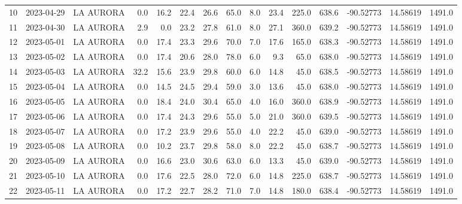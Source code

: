 \documentclass[12pt]{article}
\begin{document}
\begin{center}
\begin{tabular}{lllrrrrrrrrrrrr}
10  & 2023-04-29 &  LA AURORA &     0.0 &  16.2 &   22.4 &  26.6 &     65.0 &  8.0 &        23.4 &       225.0 &      638.6 & -90.52773 &  14.58619 &   1491.0 \\
11  & 2023-04-30 &  LA AURORA &     2.9 &   0.0 &   23.2 &  27.8 &     61.0 &  8.0 &        27.1 &       360.0 &      639.2 & -90.52773 &  14.58619 &   1491.0 \\
12  & 2023-05-01 &  LA AURORA &     0.0 &  17.4 &   23.3 &  29.6 &     70.0 &  7.0 &        17.6 &       165.0 &      638.3 & -90.52773 &  14.58619 &   1491.0 \\
13  & 2023-05-02 &  LA AURORA &     0.0 &  17.4 &   20.6 &  28.0 &     78.0 &  6.0 &         9.3 &        65.0 &      638.0 & -90.52773 &  14.58619 &   1491.0 \\
14  & 2023-05-03 &  LA AURORA &    32.2 &  15.6 &   23.9 &  29.8 &     60.0 &  6.0 &        14.8 &        45.0 &      638.5 & -90.52773 &  14.58619 &   1491.0 \\
15  & 2023-05-04 &  LA AURORA &     0.0 &  14.5 &   24.5 &  29.4 &     59.0 &  3.0 &        13.6 &        45.0 &      638.0 & -90.52773 &  14.58619 &   1491.0 \\
16  & 2023-05-05 &  LA AURORA &     0.0 &  18.4 &   24.0 &  30.4 &     65.0 &  4.0 &        16.0 &       360.0 &      638.9 & -90.52773 &  14.58619 &   1491.0 \\
17  & 2023-05-06 &  LA AURORA &     0.0 &  17.4 &   24.3 &  29.6 &     55.0 &  5.0 &        21.0 &       360.0 &      639.5 & -90.52773 &  14.58619 &   1491.0 \\
18  & 2023-05-07 &  LA AURORA &     0.0 &  17.2 &   23.9 &  29.6 &     55.0 &  4.0 &        22.2 &        45.0 &      639.0 & -90.52773 &  14.58619 &   1491.0 \\
19  & 2023-05-08 &  LA AURORA &     0.0 &  10.2 &   23.7 &  29.8 &     58.0 &  8.0 &        22.2 &        45.0 &      638.7 & -90.52773 &  14.58619 &   1491.0 \\
20  & 2023-05-09 &  LA AURORA &     0.0 &  16.6 &   23.0 &  30.6 &     63.0 &  6.0 &        13.3 &        45.0 &      639.0 & -90.52773 &  14.58619 &   1491.0 \\
21  & 2023-05-10 &  LA AURORA &     0.0 &  17.6 &   22.5 &  28.0 &     72.0 &  6.0 &        14.8 &       225.0 &      638.7 & -90.52773 &  14.58619 &   1491.0 \\
22  & 2023-05-11 &  LA AURORA &     0.0 &  17.2 &   22.7 &  28.2 &     71.0 &  7.0 &        14.8 &       180.0 &      638.4 & -90.52773 &  14.58619 &   1491.0 \\

\end{tabular}
\end{center}
\end{document}
